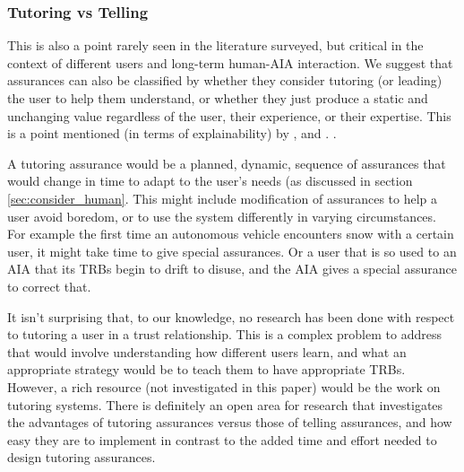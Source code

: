 \subsubsection{Tutoring vs Telling} \label{sec:teach_tell}
    This is also a point rarely seen in the literature surveyed, but critical in the context of different users and long-term human-AIA interaction. We suggest that assurances can also be classified by whether they consider tutoring (or leading) the user to help them understand, or whether they just produce a static and unchanging value regardless of the user, their experience, or their expertise. This is a point mentioned (in terms of explainability) by \citet{Lacave2002-cu}, and \citet{Lacher2014-yc}. .

    A tutoring assurance would be a planned, dynamic, sequence of assurances that would change in time to adapt to the user's needs (as discussed in section \ref{sec:consider_human}. This might include modification of assurances to help a user avoid boredom, or to use the system differently in varying circumstances. For example the first time an autonomous vehicle encounters snow with a certain user, it might take time to give special assurances. Or a user that is so used to an AIA that its TRBs begin to drift to disuse, and the AIA gives a special assurance to correct that.

    It isn't surprising that, to our knowledge, no research has been done with respect to tutoring a user in a trust relationship. This is a complex problem to address that would involve understanding how different users learn, and what an appropriate strategy would be to teach them to have appropriate TRBs. However, a rich resource (not investigated in this paper) would be the work on tutoring systems. There is definitely an open area for research that investigates the advantages of tutoring assurances versus those of telling assurances, and how easy they are to implement in contrast to the added time and effort needed to design tutoring assurances.

